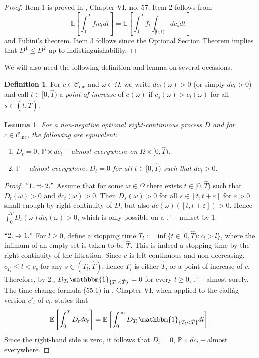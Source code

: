 \documentclass[11pt, oneside]{article}   	%
\theoremstyle{plain}
\newtheorem{lem}[thm]{Lemma}
\theoremstyle{definition}
\newtheorem{defn}[thm]{Definition}
\theoremstyle{remark}
\begin{document}
\begin{proof}
Item 1 is proved in \cite{dellacherie-meyerB}, Chapter VI, no. 57. Item 2 follows from
$$\mathbb{E}\left[\int_0^{\hat{T}} f_t c_t dt\right]=\mathbb{E}\left[\int_0^{\hat{T}} f_t \int_{[0,t)}dc_s dt\right]$$
and Fubini's theorem. Item 3 follows since the Optional Section Theorem implies that $D^1\leq D^2$ up to indistinguishability.
\end{proof}
We will also need the following definition and lemma on several occasions.
\begin{defn}\label{def:pt-of-increase}
For $c\in\mathcal{C}_{\text{inc}}$ and $\omega\in\Omega$, we write $dc_t(\omega)>0$ (or simply $dc_t>0$) and call $t\in[0,\hat{T})$ a \textit{point of increase} of $c(\omega)$ if $c_{s}(\omega)>c_t(\omega)$ for all $s\in(t,\hat{T})$.
\end{defn}
\begin{lem}\label{lem:pt-of-increase}
For a non-negative optional right-continuous process $D$ and for $c\in\mathcal{C}_\text{inc}$, the following are equivalent:
\begin{enumerate}
\item $D_t=0$, $\mathbb{P}\times dc_t-$almost everywhere on $\Omega\times[0,{\hat{T}})$.
\item $\mathbb{P}-$almost everywhere, $D_t= 0$ for all $t\in[0,{\hat{T}})$ such that $dc_t>0$.
\end{enumerate}
\end{lem}
\begin{proof}
$``1.\Rightarrow 2."$
Assume that for some $\omega\in\Omega$ there exists $t\in[0,{\hat{T}})$ such that $D_t(\omega)> 0$ and $dc_t(\omega)>0$. Then $D_s(\omega)>0$ for all $s\in[t,t+\varepsilon]$ for $\varepsilon>0$ small enough by right-continuity of $D$, but also $dc(\omega)([t,t+\varepsilon])>0$. Hence $\int_0^{\hat{T}} D_t(\omega)dc_t(\omega)>0$, which is only possible on a $\mathbb{P}-$nullset by 1.

$``2.\Rightarrow 1."$
For $l\geq 0$, define a stopping time $T_l:=\inf\{t\in[0,{\hat{T}}): c_t>l\}$, where the infimum of an empty set is taken to be ${\hat{T}}$. This is indeed a stopping time by the right-continuity of the filtration. Since $c$ is left-continuous and non-decreasing, $c_{T_l}\leq l<c_{s}$ for any $s\in(T_l,{\hat{T}})$, hence $T_l$ is either ${\hat{T}}$, or a point of increase of $c$. Therefore, by 2., $D_{T_l}\mathbbm{1}_{\{T_l<{\hat{T}}\}}=0$ for every $l\geq0$, $\mathbb{P}-$almost surely. The time-change formula (55.1) in \cite{dellacherie-meyerB}, Chapter VI, when applied to the  c\`adl\`ag version $c'_t$ of $c_t$, states that
$$\mathbb{E}\left[\int_0^{\hat{T}} D_tdc_t\right]=\mathbb{E}\left[\int_0^\infty D_{T_l}\mathbbm{1}_{\{T_l<{\hat{T}}\}}dl\right].$$
Since the right-hand side is zero, it follows that $D_t=0$, $\mathbb{P}\times dc_t-$almost everywhere.
\end{proof}
\end{document}
